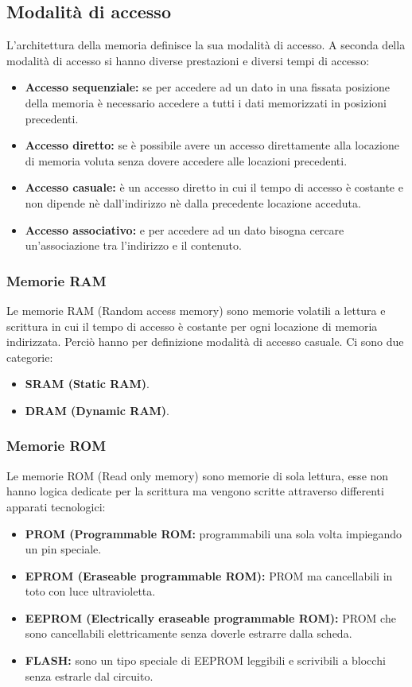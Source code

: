 \documentclass{article}
\begin{document}
\subsection{Modalità di accesso}
L’architettura della memoria definisce la sua modalità di accesso. A seconda della modalità di accesso si hanno diverse prestazioni e diversi tempi di accesso:
\begin{itemize}
    \item \textbf{Accesso sequenziale:} se per accedere ad un dato in una fissata posizione della memoria è necessario accedere a tutti i dati memorizzati in posizioni precedenti.
    \item \textbf{Accesso diretto:} se è possibile avere un accesso direttamente alla locazione di memoria voluta senza dovere accedere alle locazioni precedenti.
    \item \textbf{Accesso casuale:} è un accesso diretto in cui il tempo di accesso è costante e non dipende nè dall’indirizzo nè dalla precedente locazione acceduta.
    \item \textbf{Accesso associativo:} e per accedere ad un dato bisogna cercare un’associazione tra l’indirizzo e il contenuto. 
\end{itemize}

\subsubsection{Memorie RAM}
Le memorie RAM (Random access memory) sono memorie volatili a lettura e scrittura in cui il tempo di accesso è costante per ogni locazione di memoria indirizzata. Perciò hanno per definizione modalità di accesso casuale. Ci sono due categorie: 
\begin{itemize}
    \item \textbf{SRAM (Static RAM)}.
    \item \textbf{DRAM (Dynamic RAM)}.
\end{itemize}

\subsubsection{Memorie ROM}
Le memorie ROM (Read only memory) sono memorie di sola lettura, esse non hanno logica dedicate per la scrittura ma vengono scritte attraverso differenti apparati tecnologici:
\begin{itemize}
    \item \textbf{PROM (Programmable ROM:} programmabili una sola volta impiegando un pin speciale.
    \item  \textbf{EPROM (Eraseable programmable ROM):} PROM ma cancellabili in toto con luce ultravioletta.
    \item  \textbf{EEPROM (Electrically eraseable programmable ROM):} PROM che sono cancellabili elettricamente senza doverle estrarre dalla scheda.
    \item \textbf{FLASH:}  sono un tipo speciale di EEPROM leggibili e scrivibili a blocchi senza estrarle dal circuito.
\end{itemize}
\end{document}
